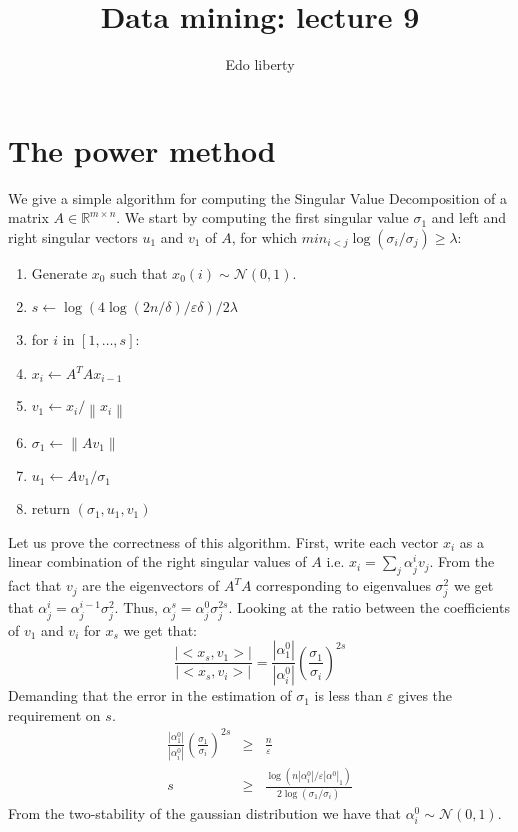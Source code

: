 \documentclass{article}
\title{Data mining: lecture 9} %
\author{Edo liberty}
\date{\nonumber}
\newcommand{\eps}{\varepsilon}
\newcommand{\tab}{\hspace{.5cm}}
\newcommand{\R}{\mathbb R}
\newcommand{\N}{\mathcal N}
\newcommand{\norm}[1]{\left \lVert #1 \right \rVert}
\begin{document}
\maketitle

\section{The power method}

We give a simple algorithm for computing the Singular Value Decomposition of a matrix $A \in \R^{m \times n}$.
We start by computing the first singular value $\sigma_1$ and left and right singular vectors $u_1$ and $v_1$ of $A$,
for which $min_{i<j}\log(\sigma_i/\sigma_j) \ge \lambda$:
\begin{enumerate}
\item Generate $x_0$ such that $x_0(i) \sim \N(0,1)$.
\item $s \leftarrow  \log(4\log(2n/\delta)/\eps\delta)/2\lambda$ 
\item for $i$ in $[1,\ldots,s]$:
\item \tab $x_i \leftarrow A^{T}Ax_{i-1}$
\item $v_1 \leftarrow x_i/\norm{x_i}$  
\item $\sigma_1 \leftarrow \norm{Av_1}$
\item $u_1 \leftarrow Av_1/\sigma_1$ 
\item return $(\sigma_1,u_1,v_1)$ 
\end{enumerate}
Let us prove the correctness of this algorithm.
First, write each vector $x_i$ as a linear combination of the right singular values of $A$ i.e. $x_i = \sum_{j} \alpha^{i}_{j}v_j$. 
From the fact that $v_j$ are the eigenvectors of $A^{T}A$ corresponding to eigenvalues $\sigma^{2}_j$ 
we get that $\alpha^{i}_{j}= \alpha^{i-1}_{j}\sigma^{2}_{j}$.
Thus, $\alpha^{s}_{j} = \alpha^{0}_{j}\sigma^{2s}_{j}$. Looking at the ratio between the coefficients of $v_1$ and $v_i$ for $x_s$
we get that:
 \[
 \frac{|<x_s,v_1>|}{|<x_s,v_i>|} = \frac{|\alpha^{0}_{1}|}{|\alpha^{0}_{i}|}\left(\frac{\sigma_1}{\sigma_i}\right)^{2s}
\]
Demanding that the error in the estimation of $\sigma_1$ is less than $\eps$ gives the requirement on $s$.
\begin{eqnarray}
\frac{|\alpha^{0}_{1}|}{|\alpha^{0}_{i}|}\left(\frac{\sigma_1}{\sigma_i}\right)^{2s} &\ge& \frac{n}{\eps}\\
s &\ge& \frac{\log(n|\alpha^{0}_i|/\eps|\alpha^{0}|_1)}{2\log(\sigma_1/\sigma_i)}
\end{eqnarray}
From the two-stability of the gaussian distribution we have that $\alpha^{0}_i \sim \N(0,1)$. 
\end{document}
